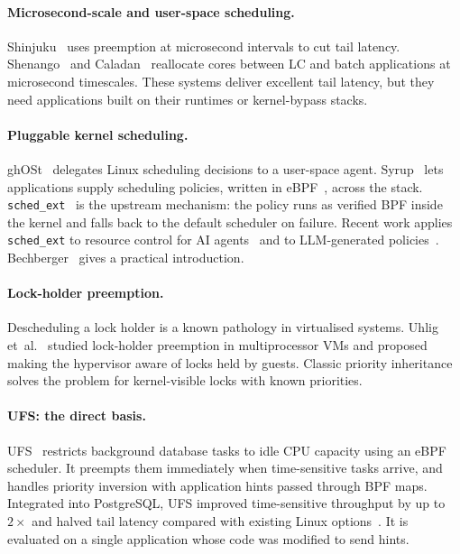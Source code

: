 \documentclass[11pt,a4paper]{article}
\newcommand{\code}[1]{\texttt{#1}}
\begin{document}
\paragraph{Microsecond-scale and user-space scheduling.}
Shinjuku~\cite{kaffes2019shinjuku} uses preemption at microsecond intervals to
cut tail latency. Shenango~\cite{ousterhout2019shenango} and
Caladan~\cite{fried2020caladan} reallocate cores between LC and batch
applications at microsecond timescales. These systems deliver excellent tail
latency, but they need applications built on their runtimes or kernel-bypass
stacks.

\paragraph{Pluggable kernel scheduling.}
ghOSt~\cite{humphries2021ghost} delegates Linux scheduling decisions to a
user-space agent. Syrup~\cite{kaffes2021syrup} lets applications supply
scheduling policies, written in eBPF~\cite{mccanne1993bpf}, across the stack.
\code{sched\_ext}~\cite{schedext-docs,scx-project} is the upstream mechanism:
the policy runs as verified BPF inside the kernel and falls back to the
default scheduler on failure. Recent work applies \code{sched\_ext} to
resource control for AI agents~\cite{agentcgroup2026} and to LLM-generated
policies~\cite{agenticos2026}. Bechberger~\cite{bechberger2025} gives a
practical introduction.

\paragraph{Lock-holder preemption.}
Descheduling a lock holder is a known pathology in virtualised systems.
Uhlig et~al.~\cite{uhlig2004lhp} studied lock-holder preemption in
multiprocessor VMs and proposed making the hypervisor aware of locks held by
guests. Classic priority inheritance~\cite{sha1990pip} solves the problem for
kernel-visible locks with known priorities.

\paragraph{UFS: the direct basis.}
UFS~\cite{ufs2026} restricts background database tasks to idle CPU capacity
using an eBPF scheduler. It preempts them immediately when time-sensitive
tasks arrive, and handles priority inversion with application hints passed
through BPF maps. Integrated into PostgreSQL, UFS improved time-sensitive
throughput by up to $2\times$ and halved tail latency compared with existing
Linux options~\cite{ufs2026}. It is evaluated on a single application whose
code was modified to send hints.
\end{document}
